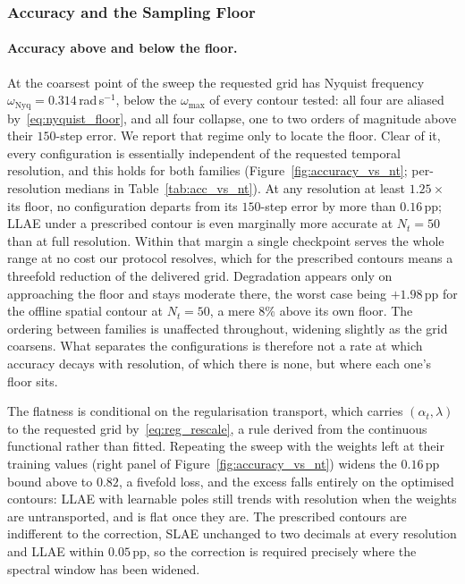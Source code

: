 ﻿\documentclass[a4paper,12pt]{article}
\theoremstyle{definition}
\theoremstyle{remark}
\begin{document}
\subsubsection{Accuracy and the Sampling Floor}
\label{sec:nt_accuracy}

\paragraph{Accuracy above and below the floor.}
At the coarsest point of the sweep the requested grid has Nyquist frequency $\omega_{\mathrm{Nyq}} = 0.314$\,rad\,s$^{-1}$, below the $\omega_{\max}$ of every contour tested: all four are aliased by~\eqref{eq:nyquist_floor}, and all four collapse, one to two orders of magnitude above their $150$-step error. We report that regime only to locate the floor. Clear of it, every configuration is essentially independent of the requested temporal resolution, and this holds for both families (Figure~\ref{fig:accuracy_vs_nt}; per-resolution medians in Table~\ref{tab:acc_vs_nt}). At any resolution at least $1.25\times$ its floor, no configuration departs from its $150$-step error by more than $0.16$\,pp; LLAE under a prescribed contour is even marginally more accurate at $N_t = 50$ than at full resolution. Within that margin a single checkpoint serves the whole range at no cost our protocol resolves, which for the prescribed contours means a threefold reduction of the delivered grid. Degradation appears only on approaching the floor and stays moderate there, the worst case being $+1.98$\,pp for the offline spatial contour at $N_t = 50$, a mere $8$\% above its own floor. The ordering between families is unaffected throughout, widening slightly as the grid coarsens. What separates the configurations is therefore not a rate at which accuracy decays with resolution, of which there is none, but where each one's floor sits.

The flatness is conditional on the regularisation transport, which carries $(\alpha_t, \lambda)$ to the requested grid by~\eqref{eq:reg_rescale}, a rule derived from the continuous functional rather than fitted. Repeating the sweep with the weights left at their training values (right panel of Figure~\ref{fig:accuracy_vs_nt}) widens the $0.16$\,pp bound above to $0.82$, a fivefold loss, and the excess falls entirely on the optimised contours: LLAE with learnable poles still trends with resolution when the weights are untransported, and is flat once they are. The prescribed contours are indifferent to the correction, SLAE unchanged to two decimals at every resolution and LLAE within $0.05$\,pp, so the correction is required precisely where the spectral window has been widened.
\end{document}
